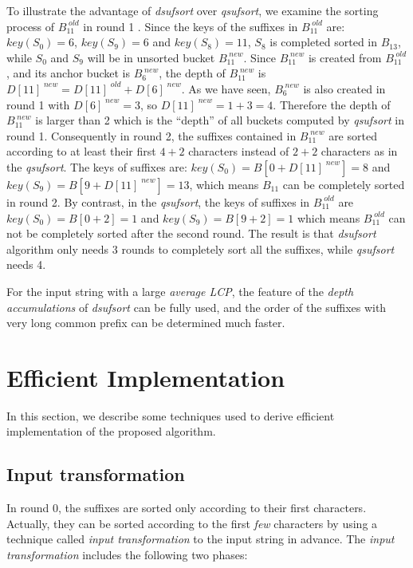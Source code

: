 \documentclass{ws-ijprai}
\begin{document}
To illustrate the advantage of \emph{dsufsort} over \emph{qsufsort},
we examine the sorting process of $B_{11}^{\;old}$ in round 1 . Since
the keys of the suffixes in $B_{11}^{\;old}$ are: $key(S_0)=6$,
$key(S_9)=6$ and $key(S_8) = 11$, $S_8$ is completed sorted in
$B_{13}$, while $S_0$ and $S_9$ will be in unsorted bucket
$B_{11}^{\;new}$.  Since $B_{11}^{\;new}$ is created from
$B_{11}^{\;old}$, and its anchor bucket is $B_6^{\;new}$, the depth of
$B_{11}^{\;new}$ is $D[11]^{\;new} = D[11]^{\;old} + D[6]^{\;new}$. As
we have seen, $B_6^{\;new}$ is also created in round 1 with
$D[6]^{\;new} = 3$, so $D[11]^{\;new} = 1 + 3 = 4$. Therefore the
depth of $B_{11}^{\;new}$ is larger than 2 which is the ``depth'' of
all buckets computed by \emph{qsufsort} in round 1.  Consequently in
round 2, the suffixes contained in $B_{11}^{\;new}$ are sorted
according to at least their first $4 +2$ characters instead of $2 + 2
$ characters as in the \emph{qsufsort}. The keys of suffixes are:
$key(S_0)=B[0+D[11] ^{\;new}]= 8$ and $key(S_9)=B[9+D[11]^{\;new}]=
13$, which means $B_{11}$ can be completely sorted in round 2. By
contrast, in the \emph{qsufsort}, the keys of suffixes in
$B_{11}^{\;old}$ are $key(S_0) = B[0+2] = 1$ and $key(S_9) = B[9+2] =
1$ which means $B_{11}^{\;old}$ can not be completely sorted after the
second round.  The result is that \emph{dsufsort} algorithm only needs
3 rounds to completely sort all the suffixes, while \emph{qsufsort}
needs 4.

For the input string with a large \emph{average LCP}, the feature of
the \emph{depth accumulations} of \emph{dsufsort} can be fully used,
and the order of the suffixes with very long common prefix can be
determined much faster.


\section{Efficient Implementation}

In this section, we describe some techniques used to derive efficient
implementation of the proposed algorithm.

\subsection{Input transformation}

In round 0, the suffixes are sorted only according to their first
characters. Actually, they can be sorted according to the first
\emph{few} characters by using a technique called \emph{input
transformation} to the input string in advance. The \emph{input
transformation} includes the following  two phases:
\end{document}
